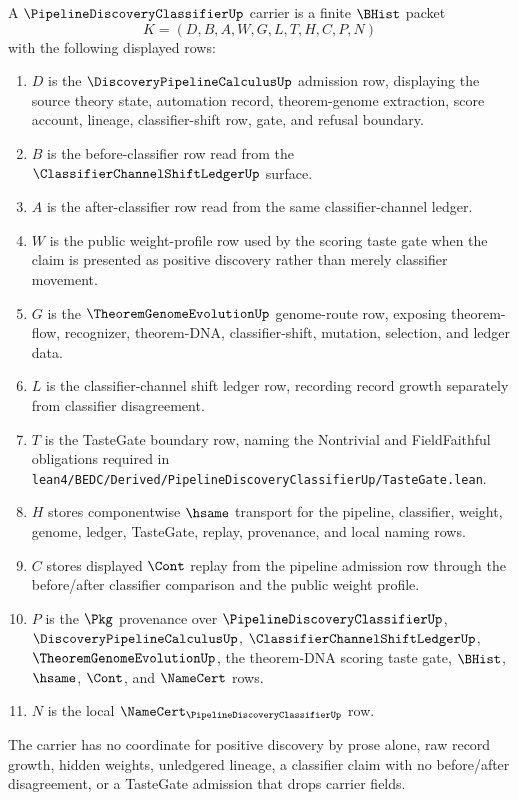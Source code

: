 \begin{definition}
\label{def:pipeline-discovery-classifier-carrier}
A $\PipelineDiscoveryClassifierUp$ carrier is a finite $\BHist$ packet
$$
K=(D,B,A,W,G,L,T,H,C,P,N)
$$
with the following displayed rows:
\begin{enumerate}
\item $D$ is the $\DiscoveryPipelineCalculusUp$ admission row, displaying the source theory state, automation record, theorem-genome extraction, score account, lineage, classifier-shift row, gate, and refusal boundary.
\item $B$ is the before-classifier row read from the $\ClassifierChannelShiftLedgerUp$ surface.
\item $A$ is the after-classifier row read from the same classifier-channel ledger.
\item $W$ is the public weight-profile row used by the scoring taste gate when the claim is presented as positive discovery rather than merely classifier movement.
\item $G$ is the $\TheoremGenomeEvolutionUp$ genome-route row, exposing theorem-flow, recognizer, theorem-DNA, classifier-shift, mutation, selection, and ledger data.
\item $L$ is the classifier-channel shift ledger row, recording record growth separately from classifier disagreement.
\item $T$ is the TasteGate boundary row, naming the Nontrivial and FieldFaithful obligations required in \texttt{lean4/BEDC/Derived/PipelineDiscoveryClassifierUp/TasteGate.lean}.
\item $H$ stores componentwise $\hsame$ transport for the pipeline, classifier, weight, genome, ledger, TasteGate, replay, provenance, and local naming rows.
\item $C$ stores displayed $\Cont$ replay from the pipeline admission row through the before/after classifier comparison and the public weight profile.
\item $P$ is the $\Pkg$ provenance over $\PipelineDiscoveryClassifierUp$, $\DiscoveryPipelineCalculusUp$, $\ClassifierChannelShiftLedgerUp$, $\TheoremGenomeEvolutionUp$, the theorem-DNA scoring taste gate, $\BHist$, $\hsame$, $\Cont$, and $\NameCert$ rows.
\item $N$ is the local $\NameCert_{\PipelineDiscoveryClassifierUp}$ row.
\end{enumerate}
The carrier has no coordinate for positive discovery by prose alone, raw record growth, hidden weights, unledgered lineage, a classifier claim with no before/after disagreement, or a TasteGate admission that drops carrier fields.
\end{definition}

